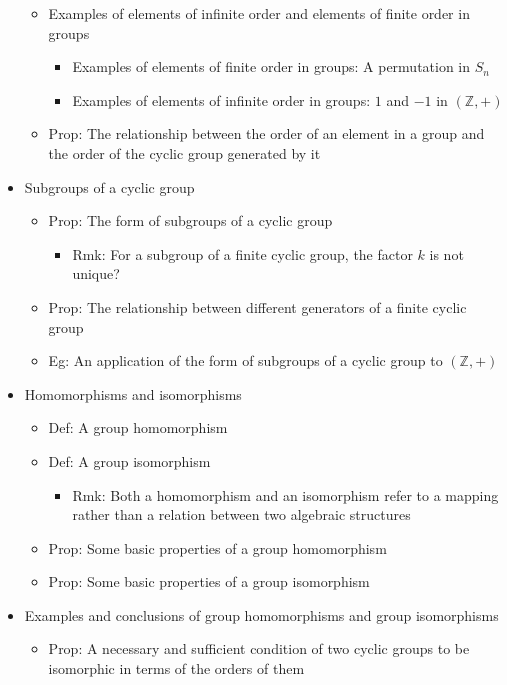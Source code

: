 \documentclass[onecolumn]{ctexart}
\begin{document}
\begin{itemize}
\begin{itemize}
    \item Examples of elements of infinite order and elements of finite order in groups
    \begin{itemize}
      \item Examples of elements of finite order in groups: A permutation in $S_n$
      \item Examples of elements of infinite order in groups: $1$ and $-1$ in $(\mathbb{Z}, +)$
    \end{itemize}
    \item Prop: The relationship between the order of an element in a group and the order of the cyclic group generated by it
  \end{itemize}
  \item Subgroups of a cyclic group
  \begin{itemize}
    \item Prop: The form of subgroups of a cyclic group
    \begin{itemize}
      \item Rmk: For a subgroup of a finite cyclic group, the factor $k$ is not unique?
    \end{itemize}
    \item Prop: The relationship between different generators of a finite cyclic group
    \item Eg: An application of the form of subgroups of a cyclic group to $(\mathbb{Z}, +)$
  \end{itemize}
  \item Homomorphisms and isomorphisms
  \begin{itemize}
    \item Def: A group homomorphism
    \item Def: A group isomorphism
    \begin{itemize}
      \item Rmk: Both a homomorphism and an isomorphism refer to a mapping rather than a relation between two algebraic structures
    \end{itemize}
    \item Prop: Some basic properties of a group homomorphism
    \item Prop: Some basic properties of a group isomorphism
  \end{itemize}
  \item Examples and conclusions of group homomorphisms and group isomorphisms
  \begin{itemize}
    \item Prop: A necessary and sufficient condition of two cyclic groups to be isomorphic in terms of the orders of them
  \end{itemize}
\end{itemize}
\end{document}
